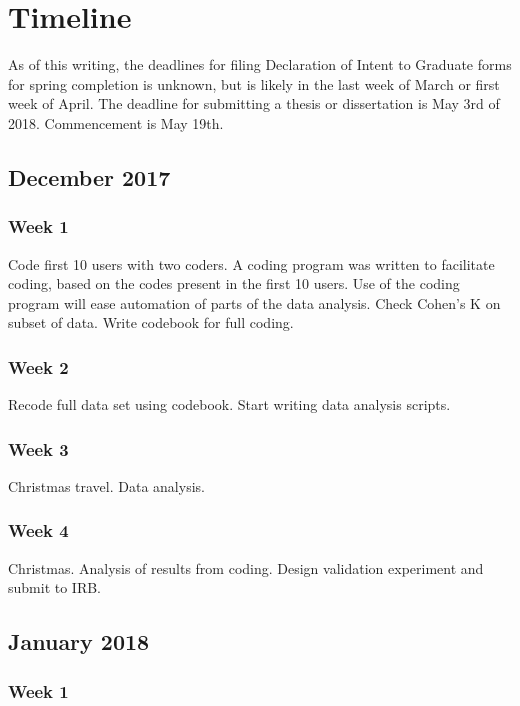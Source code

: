 \chapter{Timeline}

As of this writing, the deadlines for filing Declaration of Intent to Graduate forms for spring completion is unknown, but is likely in the last week of March or first week of April. 
The deadline for submitting a thesis or dissertation is May 3rd of 2018. 
Commencement is May 19th. 

\section{December 2017}

\subsection{Week 1}

Code first 10 users with two coders. A coding program was written to facilitate coding, based on the codes present in the first 10 users. Use of the coding program will ease automation of parts of the data analysis. 
Check Cohen's K on subset of data.
Write codebook for full coding. 

\subsection{Week 2}

Recode full data set using codebook.
Start writing data analysis scripts.

\subsection{Week 3}

Christmas travel. 
Data analysis.

\subsection{Week 4}

Christmas. 
Analysis of results from coding.
Design validation experiment and submit to IRB.

\section{January 2018}

\subsection{Week 1}

